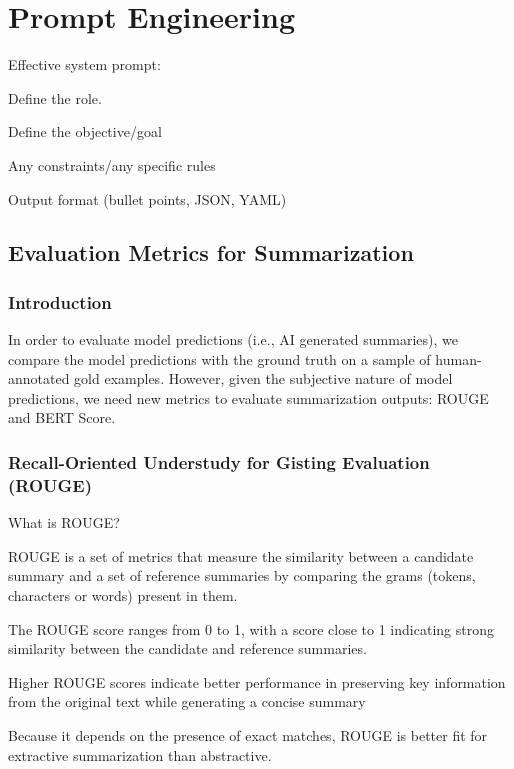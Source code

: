 \chapter{Prompt Engineering}

Effective system prompt:
\begin{numberedlist}
	\item Define the role.
	\item Define the objective/goal
	\item Any constraints/any specific rules
	\item Output format (bullet points, JSON, YAML)
\end{numberedlist} 

\section{Evaluation Metrics for Summarization}
\subsection{Introduction}
In order to evaluate model predictions (i.e., AI generated summaries), we compare the model predictions with the ground truth on a sample of human-annotated gold examples. However, given the subjective nature of model predictions, we need new metrics to evaluate summarization outputs: ROUGE and BERT Score.

\subsection{Recall-Oriented Understudy for Gisting Evaluation (ROUGE)}
What is ROUGE?
\begin{bulletedlist}
	\item ROUGE is a set of metrics that measure the similarity between a candidate summary and a set of reference summaries by comparing the grams (tokens, characters or words) present in them.
	\item The ROUGE score ranges from 0 to 1, with a score close to 1 indicating strong similarity between the candidate and reference summaries.
	\item Higher ROUGE scores indicate better performance in preserving key information from the original text while generating a concise summary
\end{bulletedlist}

Because it depends on the presence of exact matches, ROUGE is better fit for extractive summarization than abstractive.

